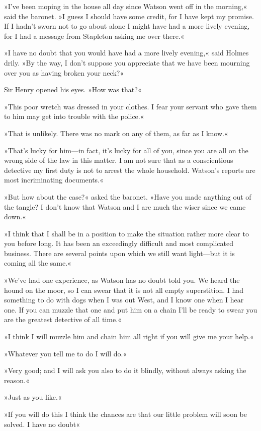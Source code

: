 »I've been moping in the house all day since Watson went off in the morning,« said the baronet. »I guess I should have some credit, for I have kept my promise. If I hadn't sworn not to go about alone I might have had a more lively evening, for I had a message from Stapleton asking me over there.«

»I have no doubt that you would have had a more lively evening,« said Holmes drily. »By the way, I don't suppose you appreciate that we have been mourning over you as having broken your neck?«

Sir Henry opened his eyes. »How was that?«

»This poor wretch was dressed in your clothes. I fear your servant who gave them to him may get into trouble with the police.«

»That is unlikely. There was no mark on any of them, as far as I know.«

»That's lucky for him—in fact, it's lucky for all of you, since you are all on the wrong side of the law in this matter. I am not sure that as a conscientious detective my first duty is not to arrest the whole household. Watson's reports are most incriminating documents.«

»But how about the case?« asked the baronet. »Have you made anything out of the tangle? I don't know that Watson and I are much the wiser since we came down.«

»I think that I shall be in a position to make the situation rather more clear to you before long. It has been an exceedingly difficult and most complicated business. There are several points upon which we still want light—but it is coming all the same.«

»We've had one experience, as Watson has no doubt told you. We heard the hound on the moor, so I can swear that it is not all empty superstition. I had something to do with dogs when I was out West, and I know one when I hear one. If you can muzzle that one and put him on a chain I'll be ready to swear you are the greatest detective of all time.«

»I think I will muzzle him and chain him all right if you will give me your help.«

»Whatever you tell me to do I will do.«

»Very good; and I will ask you also to do it blindly, without always asking the reason.«

»Just as you like.«

»If you will do this I think the chances are that our little problem will soon be solved. I have no doubt\longdash«

